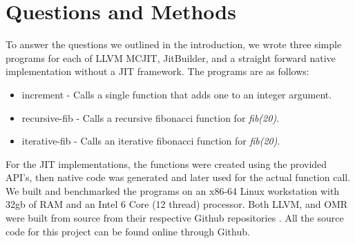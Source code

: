 \section{Questions and Methods}
\label{sec:methodology}
To answer the questions we outlined in the introduction, we wrote three simple programs for each of LLVM MCJIT, JitBuilder, and a straight forward native implementation without a JIT framework.
The programs are as follows:
\begin{itemize}
    \item increment - Calls a single function that adds one to an integer argument.
    \item recursive-fib - Calls a recursive fibonacci function for \textit{fib(20)}.
    \item iterative-fib - Calls an iterative fibonacci function for \textit{fib(20)}.  
\end{itemize}
For the JIT implementations, the functions were created using the provided API's, then native code was generated and later used for the actual function call.
We built and benchmarked the programs on an x86-64 Linux workstation with 32gb of RAM and an Intel 6 Core (12 thread) processor. 
Both LLVM, and OMR were built from source from their respective Github repositories \cite{llvmCommit, omrCommit}.
All the source code for this project can be found online through Github\cite{projectGithub}.